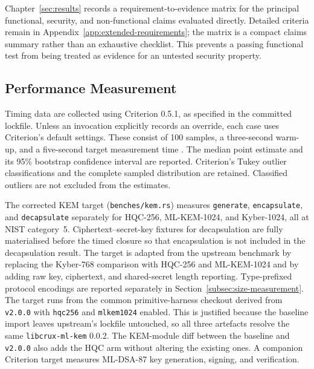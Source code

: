 Chapter~\ref{sec:results} records a requirement-to-evidence matrix for the principal functional, security, and non-functional claims evaluated directly. Detailed criteria remain in Appendix~\ref{app:extended-requirements}; the matrix is a compact claims summary rather than an exhaustive checklist. This prevents a passing functional test from being treated as evidence for an untested security property.

\subsection{Performance Measurement}
\label{subsec:perf-measurement}

Timing data are collected using Criterion 0.5.1, as specified in the committed lockfile. Unless an invocation explicitly records an override, each case uses Criterion's default settings. These consist of 100 samples, a three-second warm-up, and a five-second target measurement time \cite{heisler_bheislercriterionrs_2026}. The median point estimate and its 95\% bootstrap confidence interval are reported. Criterion's Tukey outlier classifications and the complete sampled distribution are retained. Classified outliers are not excluded from the estimates.

The corrected KEM target (\texttt{benches/kem.rs}) measures \texttt{generate}, \texttt{encapsulate}, and \texttt{decapsulate} separately for HQC-256, ML-KEM-1024, and Kyber-1024, all at NIST category~5. Ciphertext--secret-key fixtures for decapsulation are fully materialised before the timed closure so that encapsulation is not included in the decapsulation result. The target is adapted from the upstream benchmark by replacing the Kyber-768 comparison with HQC-256 and ML-KEM-1024 and by adding raw key, ciphertext, and shared-secret length reporting. Type-prefixed protocol encodings are reported separately in Section~\ref{subsec:size-measurement}. The target runs from the common primitive-harness checkout derived from \texttt{v2.0.0} with \texttt{hqc256} and \texttt{mlkem1024} enabled. This is justified because the baseline import leaves upstream's lockfile untouched, so all three artefacts resolve the same \texttt{libcrux-ml-kem} 0.0.2. The KEM-module diff between the baseline and \texttt{v2.0.0} also adds the HQC arm without altering the existing ones. A companion Criterion target measures ML-DSA-87 key generation, signing, and verification.

